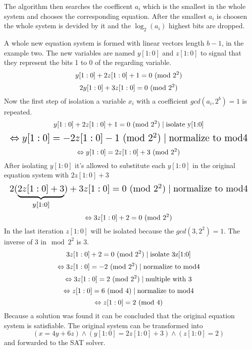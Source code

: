 The algorithm then searches the coefficent $a_i$ which is the smallest in the whole system and chooses the corresponding equation.
After the smallest $a_i$ is choosen the whole system is devided by it and the $\log_{2}(a_i)$ highest bits are dropped.

A whole new equation system is formed with linear vectors length $b-1$, in the example two.
The new variables are named $y[1:0]$ and $z[1:0]$ to signal that they represent the bits 1 to 0 of the regarding variable.
$$y[1 : 0] + 2z[1 : 0] + 1 = 0 \ (\mathrm{mod}\ 2^2)$$
$$2y[1 : 0] + 3z[1 : 0] = 0\ (\mathrm{mod}\ 2^2)$$
Now the first step of isolation a variable $x_i$ with a coefficient $gcd(a_i, 2^b)=1$ is repeated.
$$y[1 : 0] + 2z[1 : 0] + 1 = 0 \ (\mathrm{mod}\ 2^2)\mid \text{isolate y[1:0]}$$
\[\resizebox{\columnwidth}{!}{$\displaystyle
$$\Leftrightarrow y[1 : 0] = -2z[1 : 0] -1 \Mod{2^2} \mid \text{normalize to mod4}$$
$}\]
$$\Leftrightarrow y[1 : 0] = 2z[1 : 0] +3 \ (\mathrm{mod}\ 2^2)$$
After isolating $y[1 : 0] $ it's allowed to substitute each $y[1 : 0] $ in the original equation system with $2z[1:0]+3$
\[\resizebox{\columnwidth}{!}{$\displaystyle
$$2(\underbrace{2z[1:0]+3}_{y[1:0]}) + 3z[1 : 0] = 0\Mod{2^2} \mid \text{normalize to mod4}$$
$}\]
$$\Leftrightarrow 3z[1:0] + 2 = 0 \ (\mathrm{mod}\ 2^2)$$
In the last iteration $z[1:0]$ will be isolated because the $gcd(3,2^2) = 1$. The inverse of 3 in$\mod{2^2}$ is 3.
$$3z[1:0] + 2 = 0 \ (\mathrm{mod}\ 2^2) \mid \text{isolate 3z[1:0]}$$
$$\Leftrightarrow 3z[1:0]=-2  \ (\mathrm{mod}\ 2^2)   \mid \text{normalize to mod4}$$
$$\Leftrightarrow 3z[1:0]=2  \ (\mathrm{mod}\ 2^2)   \mid \text{multiple with 3}$$
$$\Leftrightarrow z[1:0]=6  \ (\mathrm{mod}\ 4)  \mid \text{normalize to mod4}$$
$$\Leftrightarrow z[1:0]=2  \ (\mathrm{mod}\ 4)$$
Because a solution was found it can be concluded that the original equation system is satisfiable.
The original system can be transformed into $$(x = 4y + 6z) \land (y[1 : 0] = 2z[1 : 0] + 3) \land (z[1 : 0] = 2)$$ and forwarded to the SAT solver.
